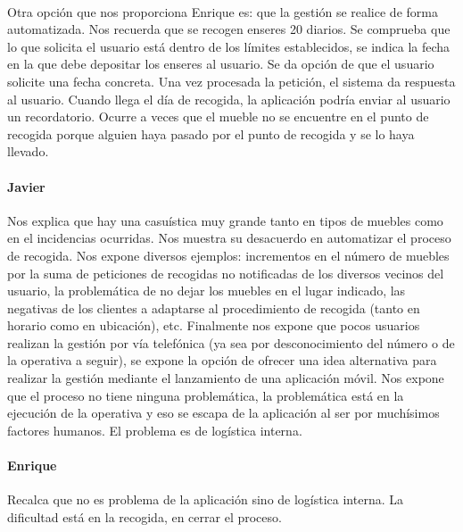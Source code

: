 \paragraph{}Otra opción que nos proporciona Enrique es: que la gestión se realice  de forma automatizada. Nos recuerda que se recogen enseres 20 diarios. Se comprueba que lo que solicita el usuario está dentro de los límites establecidos, se  indica la fecha en la que debe depositar los enseres al usuario. Se da opción de que el usuario solicite una fecha concreta. Una vez procesada la petición, el sistema da respuesta al usuario. Cuando llega el día de recogida, la aplicación podría enviar al usuario un recordatorio. Ocurre a veces que el mueble no se encuentre en el punto de recogida porque alguien haya pasado por el punto de recogida y se lo haya llevado. 
 
\paragraph{Javier} Nos explica que hay una casuística muy grande tanto en tipos de muebles como en el incidencias ocurridas. Nos muestra su desacuerdo en automatizar el proceso de recogida. Nos expone diversos ejemplos: incrementos en el número de muebles por la suma de peticiones de recogidas no notificadas de los diversos vecinos del usuario, la problemática de no dejar los muebles en el lugar indicado, las negativas de los clientes a adaptarse al procedimiento de recogida (tanto en horario como en ubicación), etc. Finalmente nos expone que pocos usuarios realizan la gestión por vía telefónica (ya sea por desconocimiento del número o de la operativa a seguir), se expone la opción de ofrecer una idea alternativa para realizar la gestión mediante el lanzamiento de una aplicación móvil. Nos expone que el proceso no tiene ninguna problemática, la problemática está en la ejecución de la operativa y eso se escapa de la aplicación al ser por muchísimos factores humanos. El problema es de logística interna.
 
\paragraph{Enrique} Recalca que no es problema de la aplicación sino de logística interna. La dificultad está en la recogida, en cerrar el proceso.
 
